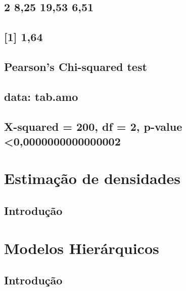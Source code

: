 \documentclass[]{book}
\theoremstyle{definition}
\theoremstyle{definition}
\theoremstyle{definition}
\theoremstyle{remark}
\begin{document}
\section{2 8,25 19,53 6,51}\label{section-49}

\section{{[}1{]} 1,64}\label{section-50}

\section{}\label{section-51}

\section{Pearson's Chi-squared test}\label{pearsons-chi-squared-test}

\section{}\label{section-52}

\section{data: tab.amo}\label{data-tab.amo}

\section{X-squared = 200, df = 2, p-value
\textless{}0,0000000000000002}\label{x-squared-200-df-2-p-value-00000000000000002}

\chapter{Estimação de densidades}\label{estimacao-de-densidades}

\section{Introdução}\label{introducao-3}

\chapter{Modelos Hierárquicos}\label{modelos-hierarquicos}

\section{Introdução}\label{introducao-4}
\end{document}
